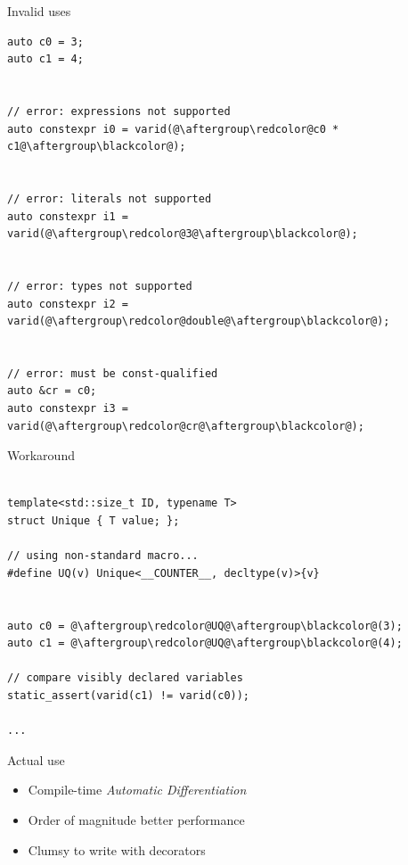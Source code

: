 \documentclass[xcolor=dvipsnames]{beamer}
\begin{document}
\begin{frame}[fragile]{Invalid uses}
\begin{lstlisting}
auto c0 = 3;
auto c1 = 4;


// error: expressions not supported
auto constexpr i0 = varid(@\aftergroup\redcolor@c0 * c1@\aftergroup\blackcolor@);


// error: literals not supported
auto constexpr i1 = varid(@\aftergroup\redcolor@3@\aftergroup\blackcolor@);


// error: types not supported
auto constexpr i2 = varid(@\aftergroup\redcolor@double@\aftergroup\blackcolor@);


// error: must be const-qualified
auto &cr = c0;
auto constexpr i3 = varid(@\aftergroup\redcolor@cr@\aftergroup\blackcolor@);
\end{lstlisting}
\end{frame}


\begin{frame}[fragile]{Workaround}
\begin{lstlisting}

template<std::size_t ID, typename T>
struct Unique { T value; };

// using non-standard macro...
#define UQ(v) Unique<__COUNTER__, decltype(v)>{v}


auto c0 = @\aftergroup\redcolor@UQ@\aftergroup\blackcolor@(3);
auto c1 = @\aftergroup\redcolor@UQ@\aftergroup\blackcolor@(4);

// compare visibly declared variables
static_assert(varid(c1) != varid(c0));

...
\end{lstlisting}
\end{frame}


\begin{frame}[fragile]{Actual use}
  \begin{itemize}
  \item Compile-time \emph{Automatic Differentiation} \vspace{5mm}
  \item Order of magnitude better performance \vspace{5mm}
  \item Clumsy to write with {} decorators \vspace{5mm}
  \end{itemize}
\end{frame}
\end{document}

